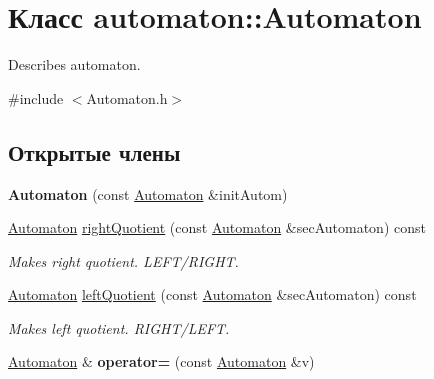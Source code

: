 \hypertarget{classautomaton_1_1_automaton}{}\section{Класс automaton\+:\+:Automaton}
\label{classautomaton_1_1_automaton}


Describes automaton.  




{\ttfamily \#include $<$Automaton.\+h$>$}

\subsection*{Открытые члены}
\begin{DoxyCompactItemize}
\item 
\mbox{\label{classautomaton_1_1_automaton_a928fe129c26a826a703e4683587568f6}} 
{\bfseries Automaton} (const \mbox{\hyperlink{classautomaton_1_1_automaton}{Automaton}} \&init\+Autom)
\item 
\mbox{\hyperlink{classautomaton_1_1_automaton}{Automaton}} \mbox{\hyperlink{classautomaton_1_1_automaton_a3e997b515536e08f97e3fef599e51d8f}{right\+Quotient}} (const \mbox{\hyperlink{classautomaton_1_1_automaton}{Automaton}} \&sec\+Automaton) const
\begin{DoxyCompactList}\small\item\em Makes right quotient. L\+E\+F\+T/\+R\+I\+G\+HT. \end{DoxyCompactList}\item 
\mbox{\hyperlink{classautomaton_1_1_automaton}{Automaton}} \mbox{\hyperlink{classautomaton_1_1_automaton_ab6ffe327d6e520f3d3c8bdf5170e53d6}{left\+Quotient}} (const \mbox{\hyperlink{classautomaton_1_1_automaton}{Automaton}} \&sec\+Automaton) const
\begin{DoxyCompactList}\small\item\em Makes left quotient. R\+I\+G\+H\+T/\+L\+E\+FT. \end{DoxyCompactList}\item 
\mbox{\label{classautomaton_1_1_automaton_a9a1c46a6e72dcb748017e397aaf005e3}} 
\mbox{\hyperlink{classautomaton_1_1_automaton}{Automaton}} \& {\bfseries operator=} (const \mbox{\hyperlink{classautomaton_1_1_automaton}{Automaton}} \&v)
\end{DoxyCompactItemize}
